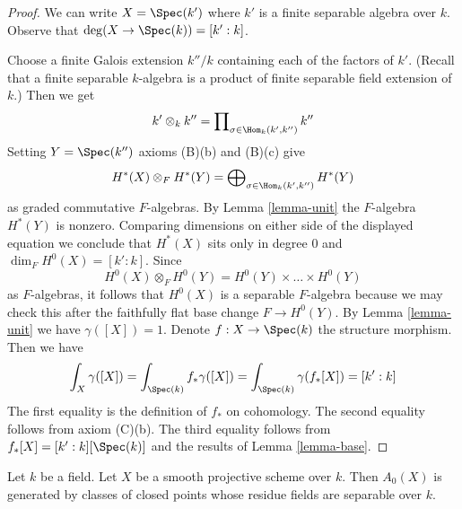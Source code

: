 \begin{proof}
We can write $X = \Spec(k')$ where $k'$ is a finite separable
algebra over $k$. Observe that $\deg(X \to \Spec(k)) = [k' : k]$.

\medskip\noindent
Choose a finite Galois extension $k''/k$ containing each of the
factors of $k'$. (Recall that a finite separable $k$-algebra is
a product of finite separable field extension of $k$.) Then we get
$$
k' \otimes_k k'' = \prod\nolimits_{\sigma \in \Hom_k(k', k'')} k''
$$
Setting $Y = \Spec(k'')$ axioms (B)(b) and (B)(c) give
$$
H^*(X) \otimes_F H^*(Y) =
\bigoplus\nolimits_{\sigma \in \Hom_k(k', k'')} H^*(Y)
$$
as graded commutative $F$-algebras. By Lemma \ref{lemma-unit} the
$F$-algebra $H^*(Y)$ is nonzero. Comparing dimensions on either side
of the displayed equation we conclude that $H^*(X)$ sits only in degree $0$ and
$\dim_F H^0(X) = [k' : k]$. Since
$$
H^0(X) \otimes_F H^0(Y) = H^0(Y) \times \ldots \times H^0(Y)
$$
as $F$-algebras, it follows that $H^0(X)$ is a separable $F$-algebra
because we may check this after the faithfully flat base change
$F \to H^0(Y)$. By Lemma \ref{lemma-unit} we have $\gamma([X]) = 1$.
Denote $f : X \to \Spec(k)$ the structure morphism. Then we have
$$
\int_X \gamma([X]) = \int_{\Spec(k)} f_*\gamma([X]) =
\int_{\Spec(k)} \gamma(f_*[X]) = [k' : k]
$$
The first equality is the definition of $f_*$ on cohomology.
The second equality follows from axiom (C)(b). The third equality
follows from $f_*[X] = [k' : k] [\Spec(k)]$ and the results
of Lemma \ref{lemma-base}.
\end{proof}

\begin{lemma}
\label{lemma-generated-by-separable}
Let $k$ be a field. Let $X$ be a smooth projective scheme over $k$.
Then $A_0(X)$ is generated by classes of closed points whose residue
fields are separable over $k$.
\end{lemma}

